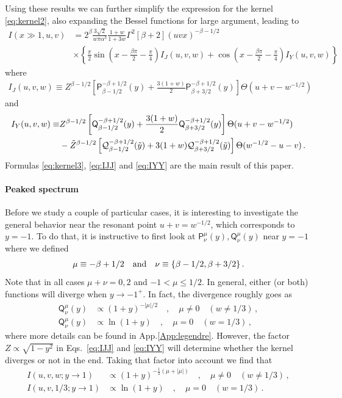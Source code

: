 \documentclass[aps,10pt,prd,groupedaddress,nofootinbib,notitlepage,eqsecnum,preprintnumbers]{revtex4-1}
\begin{document}
Using these results we can further simplify the expression for the kernel \eqref{eq:kernel2}, also expanding the Bessel functions for large argument, leading to
\begin{align}\label{eq:kernel3}
I(x\gg1,u,v)&=2^{\beta}\frac{3\sqrt{2}}{w\pi\alpha^3}\frac{1+w}{1+3w}\Gamma^2[\beta+2]{\left(uvx\right)^{-\beta-1/2}}\nonumber\\&\times\left\{\frac{\pi}{2}\sin\left(x-\frac{\beta\pi}{2}-\frac{\pi}{4}\right){I}_J(u,v,w)+\cos\left(x-\frac{\beta\pi}{2}-\frac{\pi}{4}\right){I}_Y(u,v,w)\right\}
\end{align}
where
\begin{align}\label{eq:IJJ}
I_J(u,v,w)\equiv Z^{\beta-1/2}\left[\mathsf{P}^{-\beta+1/2}_{\beta-1/2}(y)+\frac{3(1+w)}{2}\mathsf{P}^{-\beta+1/2}_{\beta+3/2}(y)\right]\Theta(u+v-w^{-1/2})
\end{align}
and
\begin{align}\label{eq:IYY}
I_Y(u,v,w)\equiv&Z^{\beta-1/2}\left[
	\mathsf{Q}^{-\beta+1/2}_{\beta-1/2}(y)+\frac{3(1+w)}{2}\mathsf{Q}^{-\beta+1/2}_{\beta+3/2}(y)\right]\Theta(u+v-w^{-1/2})\nonumber\\&
	-\tilde Z^{\beta-1/2}\left[{\cal Q}^{-\beta+1/2}_{\beta-1/2}(\tilde y)+3(1+w){\cal Q}^{-\beta+1/2}_{\beta+3/2}(\tilde y)\right]\Theta(w^{-1/2}-u-v)\,.
\end{align}
Formulas \eqref{eq:kernel3}, \eqref{eq:IJJ} and \eqref{eq:IYY} are the main result of this paper. 

\paragraph{Peaked spectrum}

Before we study a couple of particular cases, it is interesting to investigate the general behavior near the resonant point $u+v=w^{-1/2}$, which corresponds to $y=-1$. To do that, it is instructive to first look at $\mathsf{P}^\mu_\nu(y),\mathsf{Q}^\mu_\nu(y)$ near $y=-1$ where we defined
\begin{align}
\mu\equiv-\beta+1/2\quad{\rm and}\quad\nu\equiv\{\beta-1/2,\beta+3/2\}\,.
\end{align}
Note that in all cases $\mu+\nu=0,2$ and $-1<\mu\leq1/2$. In general, either (or both) functions will diverge when $y\to -1^+$. In fact, the divergence roughly goes as 
\begin{align}
\mathsf{Q}^\mu_\nu(y)&\propto \left(1+y\right)^{-|\mu|/2} \quad,\quad \mu\neq0 \quad (w\neq1/3)\,,\\
\mathsf{Q}^\mu_\nu(y)&\propto \ln(1+y) \quad,\quad \mu=0 \quad (w=1/3)\,,
\end{align}
where more details can be found in App.\ref{App:legendre}. However, the factor ${Z}\propto\sqrt{1-y^2}$ in Eqs.~\eqref{eq:IJJ} and \eqref{eq:IYY} will determine whether the kernel diverges or not in the end. Taking that factor into account we find that
\begin{align}
I(u,v,w;y\to1)&\propto \left(1+y\right)^{-\tfrac{1}{2}\left(\mu+|\mu|\right)}\quad,\quad \mu\neq0 \quad (w\neq1/3)\,,\\
I(u,v,1/3;y\to1)&\propto \ln(1+y)\quad,\quad \mu=0 \quad (w=1/3)\,.
\end{align}
\end{document}
